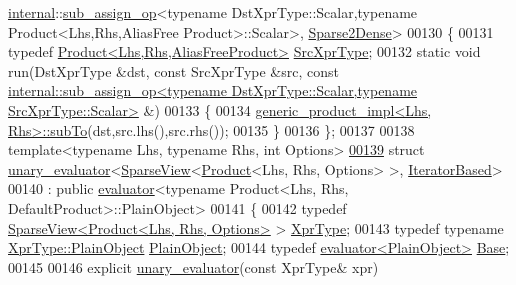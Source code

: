 \begin{DoxyCode}
      \hyperlink{namespaceinternal}{internal}::\hyperlink{struct_eigen_1_1internal_1_1sub__assign__op}{sub\_assign\_op}<typename DstXprType::Scalar,typename Product<Lhs,Rhs,AliasFree
      Product>::Scalar>, \hyperlink{struct_eigen_1_1internal_1_1_sparse2_dense}{Sparse2Dense}>
00130 \{
00131   \textcolor{keyword}{typedef} \hyperlink{group___core___module_class_eigen_1_1_product}{Product<Lhs,Rhs,AliasFreeProduct>} 
      \hyperlink{group___core___module_class_eigen_1_1_product}{SrcXprType};
00132   \textcolor{keyword}{static} \textcolor{keywordtype}{void} run(DstXprType &dst, \textcolor{keyword}{const} SrcXprType &src, \textcolor{keyword}{const} 
      \hyperlink{struct_eigen_1_1internal_1_1sub__assign__op}{internal::sub\_assign\_op<typename DstXprType::Scalar,typename SrcXprType::Scalar>}
       &)
00133   \{
00134     \hyperlink{struct_eigen_1_1internal_1_1generic__product__impl}{generic\_product\_impl<Lhs, Rhs>::subTo}(dst,src.lhs(),src.rhs());
00135   \}
00136 \};
00137 
00138 \textcolor{keyword}{template}<\textcolor{keyword}{typename} Lhs, \textcolor{keyword}{typename} Rhs, \textcolor{keywordtype}{int} Options>
\hyperlink{struct_eigen_1_1internal_1_1unary__evaluator_3_01_sparse_view_3_01_product_3_01_lhs_00_01_rhs_00009027121becdbd7ae7cc0d8a4c63ed7}{00139} \textcolor{keyword}{struct }\hyperlink{struct_eigen_1_1internal_1_1unary__evaluator}{unary\_evaluator}<\hyperlink{group___sparse_core___module_class_eigen_1_1_sparse_view}{SparseView}<\hyperlink{group___core___module_class_eigen_1_1_product}{Product}<Lhs, Rhs, Options> >, 
      \hyperlink{struct_eigen_1_1internal_1_1_iterator_based}{IteratorBased}>
00140  : \textcolor{keyword}{public} \hyperlink{struct_eigen_1_1internal_1_1evaluator}{evaluator}<typename Product<Lhs, Rhs, DefaultProduct>::PlainObject>
00141 \{
00142   \textcolor{keyword}{typedef} \hyperlink{group___sparse_core___module_class_eigen_1_1_sparse_view}{SparseView<Product<Lhs, Rhs, Options>} > 
      \hyperlink{group___sparse_core___module_class_eigen_1_1_sparse_view}{XprType};
00143   \textcolor{keyword}{typedef} \textcolor{keyword}{typename} \hyperlink{group___sparse_core___module_class_eigen_1_1_sparse_matrix}{XprType::PlainObject} \hyperlink{group___sparse_core___module_class_eigen_1_1_sparse_matrix}{PlainObject};
00144   \textcolor{keyword}{typedef} \hyperlink{struct_eigen_1_1internal_1_1evaluator}{evaluator<PlainObject>} \hyperlink{struct_eigen_1_1internal_1_1evaluator}{Base};
00145 
00146   \textcolor{keyword}{explicit} \hyperlink{struct_eigen_1_1internal_1_1unary__evaluator}{unary\_evaluator}(\textcolor{keyword}{const} XprType& xpr)

\end{DoxyCode}

